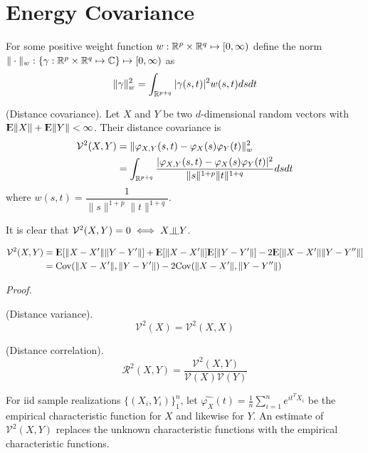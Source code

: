 
\section{Energy Covariance}

For some positive weight function
$w : \mathbb{R}^p \times \mathbb{R}^q \mapsto [0, \infty)$ define the norm
$\|\cdot\|_w : \{\gamma : \mathbb{R}^p \times \mathbb{R}^q \mapsto \mathbb{C}\}
               \mapsto [0, \infty)$ as
$$ \| \gamma \|_w^2 = \int_{\mathbb{R}^{p+q}} | \gamma(s,t) |^2 w(s,t) ds dt $$

\begin{definition}
(Distance covariance). Let $X$ and $Y$ be two $d$-dimensional random
vectors with ${\rm I\kern-.3em E}\|X\| + {\rm I\kern-.3em E}\|Y\| < \infty$. Their distance
covariance is
\begin{align*}
\mathcal{V}^2 (X,Y)
&= \| \varphi_{X,Y}(s,t) - \varphi_X(s)\varphi_Y(t) \|_w^2 \\
&= \int_{\mathbb{R}^{p+q}} \dfrac{|\varphi_{X,Y}(s,t) - \varphi_X(s)\varphi_Y(t)|^2}
                         {\|s\|^{1+p} \|t\|^{1+q}} ds dt
\end{align*}
where $w(s,t) = \dfrac{1}{\|s\|^{1+p} \|t\|^{1+q}}$.
\end{definition}

It is clear that $\mathcal{V}^2(X,Y) = 0 \iff X \indep Y$.

\begin{prop}
\begin{align*}
\mathcal{V}^2 (X,Y)
&= {\rm I\kern-.3em E}[\|X - X'\| \|Y - Y'\|]
 + {\rm I\kern-.3em E}[\|X - X'\|] {\rm I\kern-.3em E}[\|Y - Y'\|]
 - 2 {\rm I\kern-.3em E}[ \|X - X'\| \|Y - Y''\| ] \\
&= \mathrm{Cov}( \|X - X'\|, \|Y - Y'\| ) - 2 \mathrm{Cov} (\|X - X'\|, \|Y - Y''\| ) 
\end{align*}
\end{prop}
\textit{Proof.}

\begin{definition}
(Distance variance).
$$ \mathcal{V}^2 (X) = \mathcal{V}^2 (X,X) $$
\end{definition}

\begin{definition}
(Distance correlation).
$$ \mathcal{R}^2 (X,Y) = \dfrac{\mathcal{V}^2(X,Y)}
                               {\mathcal{V}(X) \mathcal{V}(Y)} $$
\end{definition}

For iid sample realizations $\{(X_i, Y_i)\}_1^n$, let
$\widehat{\varphi_X} (t) = \frac{1}{n} \sum_{i=1}^n e^{i t^T X_i}$ be
the empirical characteristic function for $X$ and likewise for $Y$. An
estimate of $\mathcal{V}^2(X,Y)$ replaces the unknown characteristic
functions with the empirical characteristic functions.

